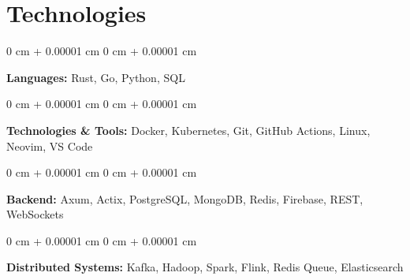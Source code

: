 \documentclass[10pt, letterpaper]{article}
\newenvironment{onecolentry}{
    \begin{adjustwidth}{
        0 cm + 0.00001 cm
    }{
        0 cm + 0.00001 cm
    }
}{
    \end{adjustwidth}
} %
\begin{document}
\section{Technologies}

\begin{onecolentry}
    \textbf{Languages:} Rust, Go, Python, SQL
\end{onecolentry}

\begin{onecolentry}
    \textbf{Technologies \& Tools:} Docker, Kubernetes, Git, GitHub Actions, Linux, Neovim, VS Code
\end{onecolentry}

\begin{onecolentry}
    \textbf{Backend:} Axum, Actix, PostgreSQL, MongoDB, Redis, Firebase, REST, WebSockets
\end{onecolentry}

\begin{onecolentry}
    \textbf{Distributed Systems:} Kafka, Hadoop, Spark, Flink, Redis Queue, Elasticsearch
\end{onecolentry}
\end{document}
